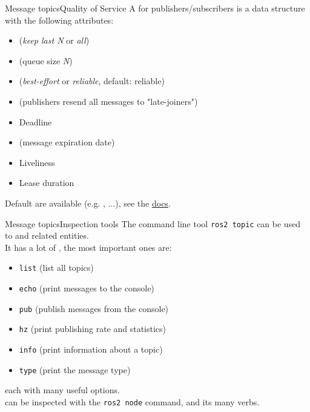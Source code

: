 \begin{frame}{Message topics}{Quality of Service}
	A  for publishers/subscribers is a data structure with the following attributes:
	\begin{itemize}
		\item {} (\emph{keep last N} or \emph{all})
		\item {} (queue size \emph{N})
		\item {} (\emph{best-effort} or \emph{reliable}, default: reliable)
		\item {} (publishers resend all messages to "late-joiners")
		\item Deadline
		\item {} (message expiration date)
		\item Liveliness
		\item Lease duration
	\end{itemize}
	Default  are available (e.g. , ...), see the \href{https://docs.ros.org/en/humble/Concepts/About-Quality-of-Service-Settings.html}{\color{blue}\underline{docs}}.
\end{frame}
\begin{frame}{Message topics}{Inspection tools}
  The command line tool \texttt{ros2 topic} can be used to  and related entities.\\
  It has a lot of , the most important ones are:
  \begin{itemize}
    \item \texttt{list} (list all topics)
    \item \texttt{echo} (print messages to the console)
    \item \texttt{pub} (publish messages from the console)
    \item \texttt{hz} (print publishing rate and statistics)
    \item \texttt{info} (print information about a topic)
    \item \texttt{type} (print the message type)
  \end{itemize}
  each with many useful options.\\
   can be inspected with the \texttt{ros2 node} command, and its many verbs.
\end{frame}

